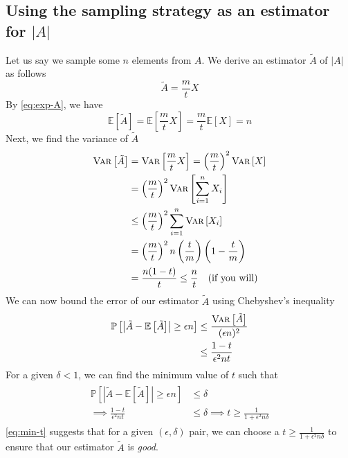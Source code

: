 \documentclass[9pt]{article}
\newcommand{\Probability}[1]{\mathbb{P}\left[ #1 \right]}
\newcommand{\Expectation}[1]{\mathbb{E}\left[ #1 \right]}
\newcommand{\Variance}[1]{\textsc{Var}\left[ #1 \right]}
\begin{document}
\subsection*{\textbf{Using the sampling strategy as an estimator for $|A|$}}
Let us say we sample some $n$ elements from $A$. We derive an estimator $\tilde{A}$
of $|A|$ as follows
\begin{equation}
    \tilde{A} = \frac{m}{t} X
\end{equation}
By \eqref{eq:exp-A}, we have
\begin{equation}
    \Expectation{\tilde{A}} = \Expectation{\frac{m}{t} X} = \frac{m}{t} \Expectation{X} = n
\end{equation}
Next, we find the variance of $\tilde{A}$
\begin{align}
    \begin{split}
        \Variance{\tilde{A}} &= \Variance{\frac{m}{t} X}
        = \left( \frac{m}{t} \right)^{2} \Variance{X} \\
        &= \left( \frac{m}{t} \right)^{2} \Variance{\sum_{i=1}^{n} X_{i}} \\
        &\leq \left( \frac{m}{t} \right)^{2} \sum_{i=1}^{n} \Variance{X_{i}} \\
        &= \left( \frac{m}{t} \right)^{2} n \left( \frac{t}{m} \right) \left( 1 - \frac{t}{m} \right) \\
        &= \frac{n(1-t)}{t} \leq \frac{n}{t} \quad \text{(if you will)}
    \end{split}
\end{align}
We can now bound the error of our estimator $\tilde{A}$ using Chebyshev's inequality
\begin{align}
    \begin{split}
        \Probability{\left| \tilde{A} - \Expectation{\tilde{A}} \right| \geq \epsilon n}
        &\leq \frac{\Variance{\tilde{A}}}{(\epsilon n)^{2}} \\
        &\leq \frac{1-t}{\epsilon^{2} nt}
    \end{split}
\end{align}
For a given $\delta < 1$, we can find the minimum value of $t$ such that
\begin{align}
    \label{eq:min-t}
    \begin{split}
        \Probability{\left| \tilde{A} - \Expectation{\tilde{A}} \right| \geq \epsilon n} &\leq \delta \\
        \implies \frac{1-t}{\epsilon^{2} nt} &\leq \delta
        \implies t \geq \frac{1}{1 + \epsilon^{2} n \delta}
    \end{split}
\end{align}
\eqref{eq:min-t} suggests that for a given $(\epsilon, \delta)$ pair, we can choose a
$t \geq \frac{1}{1 + \epsilon^{2} n \delta}$ to ensure that our estimator $\tilde{A}$
is \textit{good}.
\end{document}
